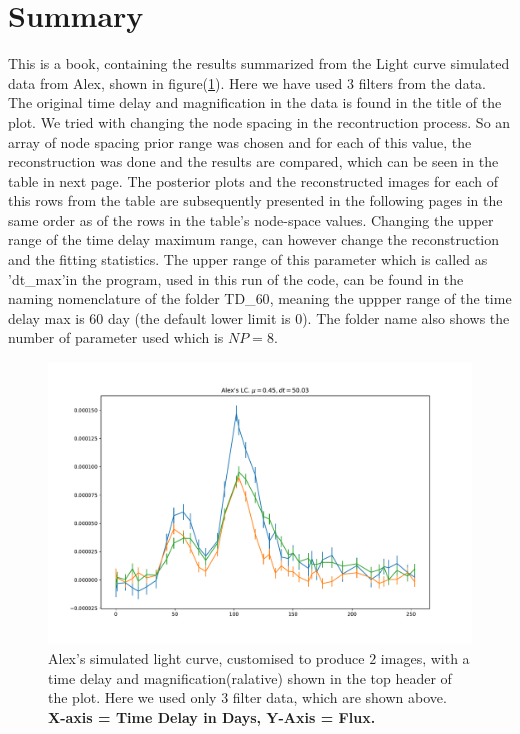 \documentclass{article}
\begin{document}
\section*{Summary}
This is a book, containing the results summarized from the Light curve simulated data from Alex, shown in figure(\ref{A}). Here we have used $3$ filters from the data. The original time delay and magnification in the data is found in the title of the plot. We tried with changing the node spacing in the recontruction process. So an array of node spacing prior range was chosen and for each of this value, the reconstruction was done and the results are compared, which can be seen in the table in next page. The posterior plots and the reconstructed images for each of this rows from the table are subsequently presented in the following pages in the same order as of the rows in the table's node-space values.
Changing the upper range of the time delay maximum range, can however change the reconstruction and the fitting statistics. The upper range of this parameter which is called as 'dt\_max'in the program, used in this run of the code, can be found in the naming nomenclature of the folder TD\_$60$, meaning the uppper range of the time delay max is $60$ day (the default lower limit is $0$). The folder name also shows the number of parameter used which is $NP=8$. 
  

\begin{figure}[h!]
  \centering
    \includegraphics[width=\textwidth]{Alex_LC.pdf}
  \caption{Alex's simulated light curve, customised to produce $2$ images, with a time delay and magnification(ralative) shown in the top header of the plot. Here we used only $3$ filter data, which are shown above.\\\hspace{\textwidth}\textbf{X-axis = Time Delay in Days, Y-Axis = Flux.}}
  \label{A}
\end{figure}
\end{document}
